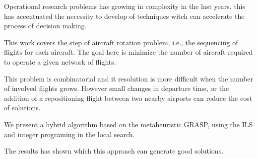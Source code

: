 \documentclass[oneside,normaltoc,espacoduplo,PGTEXdissertacao]{pgeeltex}
\begin{document}
\begin{abstractPGTEX}
\doublespacing

Operational research problems has growing in complexity in the last years, this
has accentuated the necessity to develop of techniques witch can accelerate the
process of decision making.

This work covers the step of aircraft rotation problem, i.e., the sequencing of
flights for each aircraft. The goal here is minimize the number of aircraft
required to operate a given network of flights.

This problem is combinatorial and it resolution is more difficult when the
number of involved flights grows. However small changes in departure time, or
the addition of a repositioning flight between two nearby airports can reduce
the cost of solutions.

We present a hybrid algorithm based on the metaheuristic GRASP, using the ILS
and integer programing in the local search.

The results has shown which this approach can generate good solutions.




\end{abstractPGTEX}


\listadefiguras

\listadetabelas

\listadesiglas
\end{document}
